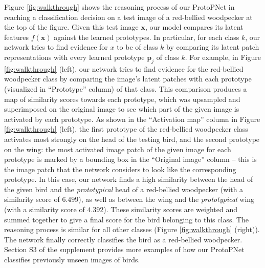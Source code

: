 \documentclass{article}
\theoremstyle{definition}
\theoremstyle{remark}
\begin{document}
Figure \ref{fig:walkthrough} shows the reasoning process of our ProtoPNet in reaching a classification decision on a test image of a red-bellied woodpecker at the top of the figure. Given this test image $\mathbf{x}$, our model compares its latent features $f(\mathbf{x})$ against the learned prototypes. In particular, for each class $k$, our network tries to find evidence for $x$ to be of class $k$ by comparing its latent patch representations with every learned prototype $\mathbf{p}_j$ of class $k$. For example, in Figure \ref{fig:walkthrough} (left), our network tries to find evidence for the red-bellied woodpecker class by comparing the image's latent patches with each prototype (visualized in ``Prototype'' column) of that class. This comparison produces a map of similarity scores towards each prototype, which was upsampled and superimposed on the original image to see which part of the given image is activated by each prototype. As shown in the ``Activation map'' column in Figure \ref{fig:walkthrough} (left), the first prototype of the red-bellied woodpecker class activates most strongly on the head of the testing bird, and the second prototype on the wing: the most activated image patch of the given image for each prototype is marked by a bounding box in the ``Original image'' column -- this is the image patch that the network considers to look like the corresponding prototype. In this case, our network finds a high similarity between the head of the given bird and the \textit{prototypical} head of a red-bellied woodpecker (with a similarity score of $6.499$), as well as between the wing and the \textit{prototypical} wing (with a similarity score of $4.392$). These similarity scores are weighted and summed together to give a final score for the bird belonging to this class. The reasoning process is similar for all other classes (Figure \ref{fig:walkthrough} (right)). The network finally correctly classifies the bird as a red-bellied woodpecker. Section S3 of the supplement provides more examples of how our ProtoPNet classifies previously unseen images of birds.

\end{document}

